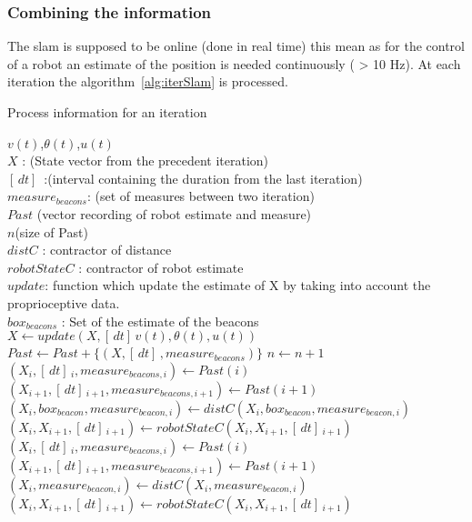\subsubsection*{Combining the information}

The slam is supposed to be online (done in real time) this mean as for the control of a robot an estimate of
the position is needed continuously ( > 10 Hz). At each iteration the algorithm~\ref{alg:iterSlam} is processed.

\begin{algorithm}[H]
\caption{Process information for an iteration }
\label{alg:iterSlam}
\begin{algorithmic}[1]
\REQUIRE $v(t)$,$\theta(t)$,$u(t)$\\
   $X$ : (State vector from the precedent iteration)\\
   $[\,dt]\,$ :(interval containing the duration from the last iteration)\\
   $measure_{beacons}$: (set of measures between two iteration)\\
   $Past$ (vector recording of robot estimate and measure)\\
   $n$(size of Past)\\
   $distC$ : contractor of distance\\
   $robotStateC$ : contractor of robot estimate\\
   $update$: function which update the estimate of X by taking into account the proprioceptive data.\\
   $box_{beacons}$ : Set of the estimate of the beacons 
\STATE $X \leftarrow update(X,[\,dt]\,v(t),\theta(t),u(t)) $
\STATE $Past  \leftarrow Past + \{(X,[\,dt]\,,measure_{beacons})\} $
\STATE $n  \leftarrow n+1 $
\STATE $(X_{i},[\,dt]\,_{i},measure_{beacons,i}) \leftarrow Past(i)$
\STATE $(X_{i+1},[\,dt]\,_{i+1},measure_{beacons,i+1}) \leftarrow Past(i+1)$
\label{op:distB_1}
\STATE $(X_{i},box_{beacon},measure_{beacon,i}) \leftarrow distC(X_{i},box_{beacon},measure_{beacon,i})$
\ENDFOR
\STATE $(X_{i},X_{i+1},[\,dt]\,_{i+1}) \leftarrow robotStateC(X_{i},X_{i+1},[\,dt]\,_{i+1})$
\ENDFOR
{}
\STATE $(X_{i},[\,dt]\,_{i},measure_{beacons,i}) \leftarrow Past(i)$
\STATE $(X_{i+1},[\,dt]\,_{i+1},measure_{beacons,i+1}) \leftarrow Past(i+1)$
\label{op:distB_2}
\STATE $(X_{i},measure_{beacon,i}) \leftarrow distC(X_{i},measure_{beacon,i})$
\ENDFOR
\STATE $(X_{i},X_{i+1},[\,dt]\,_{i+1}) \leftarrow robotStateC(X_{i},X_{i+1},[\,dt]\,_{i+1})$
\ENDFOR
\ENDIF
\end{algorithmic}
\end{algorithm}

